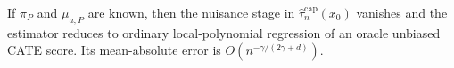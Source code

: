 If \(\pi_P\) and \(\mu_{a,P}\) are known, then the nuisance stage in \(\widehat{\tau}^{\mathrm{cap}}_n(x_0)\) vanishes and the estimator reduces to ordinary local-polynomial regression of an oracle unbiased CATE score. Its mean-absolute error is \(O(n^{-\gamma/(2\gamma+d)})\).